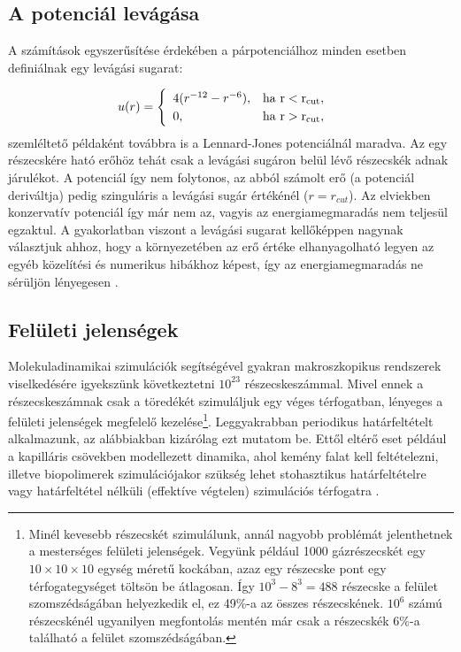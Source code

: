 \documentclass[12pt]{article}
\theoremstyle{plain}
\begin{document}
\subsection{A potenciál levágása}

A számítások egyszerűsítése érdekében a párpotenciálhoz minden esetben definiálnak egy levágási sugarat:

\begin{equation}
	u(r) = \begin{cases}
	\begin{array}{lr}
		4 (r^{-12} - r^{-6}), & \rm{ha} ~ r<r_{cut},\\
	    0,					  & \rm{ha} ~ r>r_{cut},
	\end{array}
	\end{cases}
\end{equation}
szemléltető példaként továbbra is a Lennard-Jones potenciálnál maradva.
Az egy részecskére ható erőhöz tehát csak a levágási sugáron belül lévő részecskék adnak járulékot. A potenciál így nem folytonos, az abból számolt erő (a potenciál deriváltja) pedig szinguláris a levágási sugár értékénél ($r= r_{cut}$). Az elviekben konzervatív potenciál így már nem az, vagyis az energiamegmaradás nem teljesül egzaktul. A gyakorlatban viszont a levágási sugarat kellőképpen nagynak választjuk ahhoz, hogy a környezetében az erő értéke elhanyagolható legyen az egyéb közelítési és numerikus hibákhoz képest, így az energiamegmaradás ne sérüljön lényegesen \cite{Landau2012}.


\subsection{Felületi jelenségek}

Molekuladinamikai szimulációk segítségével gyakran makroszkopikus rendszerek viselkedésére igyekszünk következtetni $10^{23}$ részecskeszámmal. Mivel ennek a részecskeszámnak csak a töredékét szimuláljuk egy véges térfogatban, lényeges a felületi jelenségek megfelelő kezelése\footnote{Minél kevesebb részecskét szimulálunk, annál nagyobb problémát jelenthetnek a mesterséges felületi jelenségek. Vegyünk például 1000 gázrészecskét egy $10\times 10 \times 10$ egység méretű kockában, azaz egy részecske pont egy térfogategységet töltsön be átlagosan. Így $10^3-8^3 = 488$ részecske a felület szomszédságában helyezkedik el, ez 49\%-a az összes részecskének. $10^6$ számú részecskénél ugyanilyen megfontolás mentén már csak a részecskék 6\%-a található a felület szomszédságában.}. Leggyakrabban periodikus határfeltételt alkalmazunk, az alábbiakban kizárólag ezt mutatom be. Ettől eltérő eset például a kapilláris csövekben modellezett dinamika, ahol kemény falat kell feltételezni, illetve biopolimerek szimulációjakor szükség lehet stohasztikus határfeltételre vagy határfeltétel nélküli (effektíve végtelen) szimulációs térfogatra \cite{lecture}. 
\end{document}
